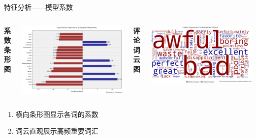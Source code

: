 \documentclass{beamer}
\begin{document}
\begin{frame}{特征分析——模型系数}
    \begin{columns}
        \textbf{系数条形图}
        \begin{center}
            \includegraphics[width=\textwidth]{pic/LR4.png}
        \end{center}

        \textbf{评论词云图}
        \begin{center}
            \includegraphics[width=\textwidth]{pic/LR5.png}
        \end{center}
    \end{columns}
    \vspace{0.2cm}
    \begin{enumerate}
        \item 横向条形图显示各词的系数
        \item 词云直观展示高频重要词汇
    \end{enumerate}
\end{frame}
\end{document}

